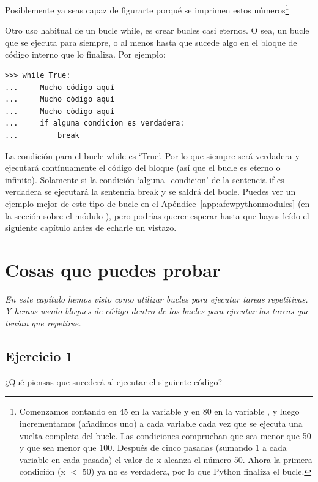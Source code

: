 Posiblemente ya seas capaz de figurarte porqué se imprimen estos números\footnote{Comenzamos contando en 45 en la variable  y en 80 en la variable , y luego incrementamos (añadimos uno) a cada variable cada vez que se ejecuta una vuelta completa del bucle.  Las condiciones comprueban que  sea menor que 50 y que  sea menor que 100.  Después de cinco pasadas (sumando 1 a cada variable en cada pasada) el valor de x alcanza el número 50.  Ahora la primera condición (x $<$ 50) ya no es verdadera, por lo que Python finaliza el bucle.}

Otro uso habitual de un bucle while, es crear bucles casi eternos. O sea, un bucle que se ejecuta para siempre, o al menos hasta que sucede algo en el bloque de código interno que lo finaliza. Por ejemplo:

\begin{listingignore}
\begin{verbatim}
>>> while True:
...     Mucho código aquí
...     Mucho código aquí
...     Mucho código aquí
...     if alguna_condicion es verdadera:
...         break
\end{verbatim}
\end{listingignore}

La condición para el bucle while es `True'.  Por lo que siempre será verdadera y ejecutará contínuamente el código del bloque (así que el bucle es eterno o infinito). Solamente si la condición `alguna\_condicion' de la sentencia if es verdadera se ejecutará la sentencia break y se saldrá del bucle. Puedes ver un ejemplo mejor de este tipo de bucle en el Apéndice~\ref{app:afewpythonmodules} (en la sección sobre el módulo ), pero podrías querer esperar hasta que hayas leído el siguiente capítulo antes de echarle un vistazo.

\section{Cosas que puedes probar}

\emph{En este capítulo hemos visto como utilizar bucles para ejecutar tareas repetitivas.  Y hemos usado bloques de código dentro de los bucles para ejecutar las tareas que tenían que repetirse.}

\subsection*{Ejercicio 1}
¿Qué piensas que sucederá al ejecutar el siguiente código?

